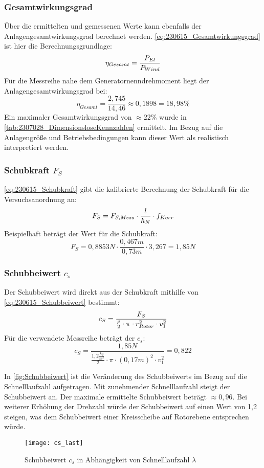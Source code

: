 \subsubsection*{Gesamtwirkungsgrad}
Über die ermittelten und gemessenen Werte kann ebenfalls der Anlagengesamtwirkungsgrad berechnet werden.
\autoref{eq:230615_Gesamtwirkungsgrad} ist hier die Berechnungsgrundlage:
\begin{equation}
    \centering
    \eta_{Gesamt} = \frac{P_{El}}{P_{Wind}}
    \label{eq:230615_Gesamtwirkungsgrad}
\end{equation}
Für die Messreihe nahe dem Generatornenndrehmoment liegt der Anlagengesamtwirkungsgrad bei:
$$\eta_{Gesamt} = \frac{2,745}{14,46}\approx 0,1898 = 18,98\%$$
Ein maximaler Gesamtwirkungsgrad von $\approx 22\%$ wurde in \autoref{tab:2307028_DimensionsloseKennzahlen} ermittelt.
Im Bezug auf die Anlagengröße und Betriebsbedingungen kann dieser Wert als realistisch interpretiert werden.
\subsubsection*{Schubkraft $F_S$}
\autoref{eq:230615_Schubkraft} gibt die kalibrierte Berechnung der Schubkraft für die Versuchsanordnung an:
\begin{equation}
    \centering
    F_S = F_{S,Mess} \cdot \frac{l}{h_N} \cdot f_{Korr}
    \label{eq:230615_Schubkraft}
\end{equation}
Beispielhaft beträgt der Wert für die Schubkraft:
$$F_S = 0,8853N \cdot \frac{0,467m}{0,73m} \cdot 3,267 = 1,85N$$
\subsubsection*{Schubbeiwert $c_s$}
Der Schubbeiwert wird direkt aus der Schubkraft mithilfe von \autoref{eq:230615_Schubbeiwert} bestimmt:
\begin{equation}
    \centering
    c_S = \frac{F_S}{\frac{\rho}{2} \cdot \pi \cdot r_{Rotor}^2 \cdot v_1^2}
    \label{eq:230615_Schubbeiwert}
\end{equation}
Für die verwendete Messreihe beträgt der $c_s$:
$$c_S = \frac{1,85N}{\frac{1,2 \frac{kg}{m^3}}{2} \cdot \pi \cdot (0,17 m)^2 \cdot v_1^2} = 0,822$$

In \autoref{fig:Schubbeiwert} ist die Veränderung des Schubbeiwerts im Bezug auf die Schnelllaufzahl aufgetragen.
Mit zunehmender Schnelllaufzahl steigt der Schubbeiwert an. Der maximale ermittelte Schubbeiwert beträgt $\approx 0,96$. Bei weiterer Erhöhung der Drehzahl würde der Schubbeiwert auf einen Wert von 1,2 steigen, was dem Schubbeiwert einer Kreisscheibe auf Rotorebene entsprechen würde.
\begin{figure}[H]
    \centering
    \texttt{[image: cs\_last]}
    \caption{Schubbeiwert $c_s$ in Abhängigkeit von Schnelllaufzahl $\lambda$}
    \label{fig:Schubbeiwert}
\end{figure}

